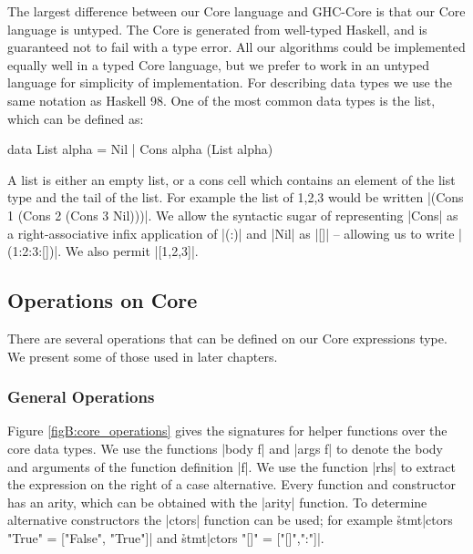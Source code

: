 The largest difference between our Core language and GHC-Core \cite{ghc_core} is that our Core language is untyped. The Core is generated from well-typed Haskell, and is guaranteed not to fail with a type error. All our algorithms could be implemented equally well in a typed Core language, but we prefer to work in an untyped language for simplicity of implementation. For describing data types we use the same notation as Haskell 98. One of the most common data types is the list, which can be defined as:

\begin{code}
data List alpha = Nil | Cons alpha (List alpha)
\end{code}

A list is either an empty list, or a cons cell which contains an element of the list type and the tail of the list. For example the list of 1,2,3 would be written |(Cons 1 (Cons 2 (Cons 3 Nil)))|. We allow the syntactic sugar of representing |Cons| as a right-associative infix application of |(:)| and |Nil| as |[]| -- allowing us to write |(1:2:3:[])|. We also permit |[1,2,3]|.


\subsection{Operations on Core}

There are several operations that can be defined on our Core expressions type. We present some of those used in later chapters.

\subsubsection{General Operations}


Figure \ref{figB:core_operations} gives the signatures for helper functions over the core data types. We use the functions |body f| and |args f| to denote the body and arguments of the function definition |f|. We use the function |rhs| to extract the expression on the right of a case alternative. Every function and constructor has an arity, which can be obtained with the |arity| function. To determine alternative constructors the |ctors| function can be used; for example \h{stmt}|ctors "True" = ["False", "True"]| and \h{stmt}|ctors "[]" = ["[]",":"]|.



